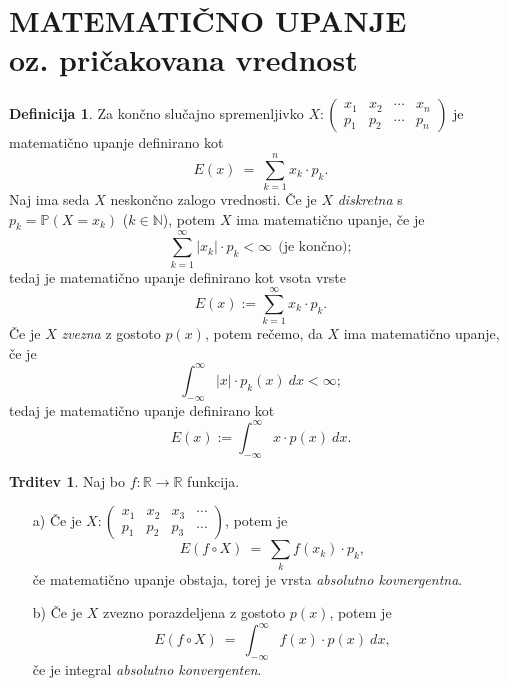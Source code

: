 \documentclass[11pt]{article}
\theoremstyle{definition}
\newtheorem{definicija}{Definicija}[section]
\theoremstyle{definition}
\newtheorem{trditev}{Trditev}[section]
\theoremstyle{definition}
\begin{document}

\section{MATEMATIČNO UPANJE \\oz. pričakovana vrednost}
\vspace{0.5cm}

\begin{definicija}

Za končno slučajno spremenljivko $X: \begin{pmatrix}
	x_1 & x_2 & \cdots & x_n \\
	p_1 & p_2 & \cdots & p_n
\end{pmatrix}$ je matematično upanje definirano kot 
$$E(x) ~=~ \sum_{k=1}^n x_k \cdot p_k.$$
Naj ima seda $X$ neskončno zalogo vrednosti. Če je $X$ \textit{diskretna} s $p_k = \mathbb{P}(X = x_k)$ ($k \in \mathbb{N}$), potem $X$ ima matematično upanje, če je 
$$\sum_{k=1}^{\infty} |x_k| \cdot p_k < \infty ~~\text{(je končno)};$$
tedaj je matematično upanje definirano kot vsota vrste 
$$E(x) := \sum_{k=1}^{\infty} x_k \cdot p_k.$$
Če je $X$ \textit{zvezna} z gostoto $p(x)$, potem rečemo, da $X$ ima matematično upanje, če je
$$\int_{-\infty}^{\infty} |x| \cdot p_k(x) ~dx < \infty;$$
tedaj je matematično upanje definirano kot
$$E(x) := \int_{-\infty}^{\infty} x \cdot p(x) ~dx.$$

\end{definicija}
\vspace{0.5cm}

\begin{trditev}

Naj bo $f: \mathbb{R} \rightarrow \mathbb{R}$ funkcija.
\begin{enumerate}
	\item[a)] Če je $X: \begin{pmatrix}
	x_1 & x_2 & x_3 & \cdots \\
	p_1 & p_2 & p_3 & \cdots
\end{pmatrix}$, potem je 
	$$E(f \circ X) ~=~ \sum_k f(x_k) \cdot p_k,$$
	če matematično upanje obstaja, torej je vrsta \textit{absolutno kovnergentna}.
	\item[b)] Če je $X$ zvezno porazdeljena z gostoto $p(x)$, potem je 
	$$E(f \circ X) ~=~ \int_{-\infty}^{\infty} f(x) \cdot p(x) ~dx,$$
	če je integral \textit{absolutno konvergenten}.
\end{enumerate}

\end{trditev}
\vspace{0.5cm}
\end{document}
